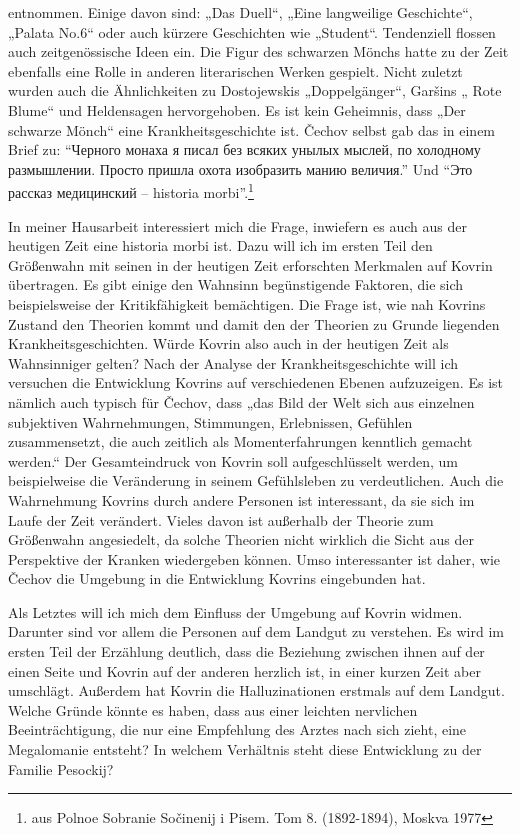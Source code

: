 \documentclass[12pt,headsepline,a4paper]{scrartcl}
\newcommand\textcyr[1]{{\fontencoding{OT2}\fontfamily{wncyr}\selectfont ``#1''}}
\begin{document}
entnommen. Einige davon sind: „Das Duell“, „Eine langweilige Geschichte“, „Palata No.6“ oder
auch kürzere Geschichten wie „Student“.\autocite{woern} Tendenziell flossen auch zeitgenössische Ideen ein.\autocite{dudek} Die
Figur des schwarzen Mönchs hatte zu der Zeit ebenfalls eine Rolle in anderen literarischen Werken
gespielt.\autocite{winner} Nicht zuletzt wurden auch die Ähnlichkeiten zu Dostojewskis „Doppelgänger“\autocite{woell}, Garšins
„ Rote Blume“\autocite{freise97} und Heldensagen\autocite{senderovich} hervorgehoben.
Es ist kein Geheimnis, dass „Der schwarze Mönch“ eine Krankheitsgeschichte ist. Čechov selbst
gab das in einem Brief zu: \textcyr{Черного монаха я писал без всяких унылых мыслей, по холодному
размышлении. Просто пришла охота изобразить манию величия.} Und \textcyr{Это рассказ
медицинский -- historia morbi}.\footnote{ aus
Polnoe Sobranie Sočinenij i Pisem. Tom 8. (1892-1894), Moskva 1977}

In meiner Hausarbeit interessiert mich die Frage, inwiefern es auch aus der heutigen Zeit eine
historia morbi ist. Dazu will ich im ersten Teil den Größenwahn mit seinen in der heutigen Zeit
erforschten Merkmalen auf Kovrin übertragen. Es gibt einige den Wahnsinn begünstigende
Faktoren, die sich beispielsweise der Kritikfähigkeit bemächtigen. Die Frage ist, wie nah Kovrins
Zustand den Theorien kommt und damit den der Theorien zu Grunde liegenden
Krankheitsgeschichten. Würde Kovrin also auch in der heutigen Zeit als Wahnsinniger gelten?
Nach der Analyse der Krankheitsgeschichte will ich versuchen die Entwicklung Kovrins auf
verschiedenen Ebenen aufzuzeigen. Es ist nämlich auch typisch für Čechov, dass „das Bild der Welt
sich aus einzelnen subjektiven Wahrnehmungen, Stimmungen, Erlebnissen, Gefühlen
zusammensetzt, die auch zeitlich als Momenterfahrungen kenntlich gemacht werden.“\autocite[83]{hielscher} Der
Gesamteindruck von Kovrin soll aufgeschlüsselt werden, um beispielweise die Veränderung in
seinem Gefühlsleben zu verdeutlichen. Auch die Wahrnehmung Kovrins durch andere Personen ist
interessant, da sie sich im Laufe der Zeit verändert. Vieles davon ist außerhalb der Theorie zum
Größenwahn angesiedelt, da solche Theorien nicht wirklich die Sicht aus der Perspektive der
Kranken wiedergeben können. Umso interessanter ist daher, wie Čechov die Umgebung in die
Entwicklung Kovrins eingebunden hat.

Als Letztes will ich mich dem Einfluss der Umgebung auf Kovrin widmen. Darunter sind vor allem
die Personen auf dem Landgut zu verstehen. Es wird im ersten Teil der Erzählung deutlich, dass die
Beziehung zwischen ihnen auf der einen Seite und Kovrin auf der anderen herzlich ist, in einer
kurzen Zeit aber umschlägt. Außerdem hat Kovrin die Halluzinationen erstmals auf dem Landgut.
Welche Gründe könnte es haben, dass aus einer leichten nervlichen Beeinträchtigung, die nur eine
Empfehlung des Arztes nach sich zieht, eine Megalomanie entsteht? In welchem Verhältnis steht
diese Entwicklung zu der Familie Pesockij?
\end{document}
